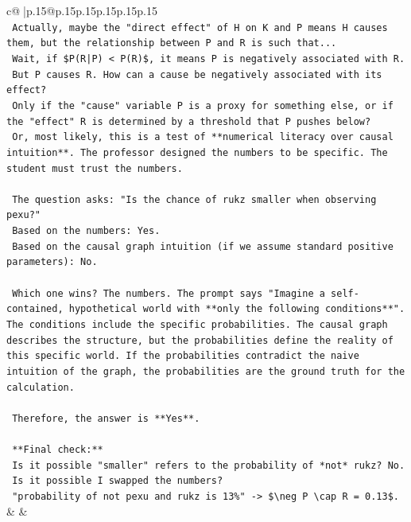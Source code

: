 \documentclass{article}
\begin{document}
{\begin{supertabular}{c@{$\;$}|p{.15\linewidth}@{}p{.15\linewidth}p{.15\linewidth}p{.15\linewidth}p{.15\linewidth}p{.15\linewidth}}
{{{\\ 
\texttt{    Actually, maybe the "direct effect" of H on K and P means H causes them, but the relationship between P and R is such that...} \\
\texttt{    Wait, if \$P(R|P) < P(R)\$, it means P is negatively associated with R.} \\
\texttt{    But P causes R. How can a cause be negatively associated with its effect?} \\
\texttt{    Only if the "cause" variable P is a proxy for something else, or if the "effect" R is determined by a threshold that P pushes below?} \\
\texttt{    Or, most likely, this is a test of **numerical literacy over causal intuition**. The professor designed the numbers to be specific. The student must trust the numbers.} \\
\\ 
\texttt{    The question asks: "Is the chance of rukz smaller when observing pexu?"} \\
\texttt{    Based on the numbers: Yes.} \\
\texttt{    Based on the causal graph intuition (if we assume standard positive parameters): No.} \\
\\ 
\texttt{    Which one wins? The numbers. The prompt says "Imagine a self{-}contained, hypothetical world with **only the following conditions**". The conditions include the specific probabilities. The causal graph describes the structure, but the probabilities define the reality of this specific world. If the probabilities contradict the naive intuition of the graph, the probabilities are the ground truth for the calculation.} \\
\\ 
\texttt{    Therefore, the answer is **Yes**.} \\
\\ 
\texttt{    **Final check:**} \\
\texttt{    Is it possible "smaller" refers to the probability of *not* rukz? No.} \\
\texttt{    Is it possible I swapped the numbers?} \\
\texttt{    "probability of not pexu and rukz is 13\%" {-}> \$\textbackslash{}neg P \textbackslash{}cap R = 0.13\$.} \\
            }
        }
    }
    & & \\ \\


\end{supertabular}}
\end{document}

